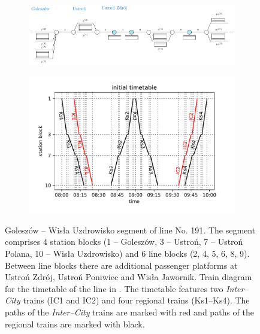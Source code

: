 \begin{figure}
  \begin{subfigure}{\textwidth}
    \caption{}\label{fig:linelarge:line}
    \includegraphics[width=\textwidth]{figures/line.pdf}
  \end{subfigure}
  \begin{subfigure}{\textwidth}
    \caption{}\label{fig:linelarge:diagram}
    \includegraphics[width=\textwidth]{figures/train_diagram}
  \end{subfigure}
  \caption{ Goleszów -- Wisła Uzdrowisko segment of line No. 191. The segment comprises 4
      station blocks (1 -- Goleszów, 3 -- Ustroń, 7 -- Ustroń Polana, 10 -- Wisła
      Uzdrowisko) and 6 line blocks (2, 4, 5, 6, 8, 9). Between line blocks there are
      additional passenger platforms at Ustroń Zdrój, Ustroń Poniwiec and Wisła
      Jawornik.  Train diagram for the timetable of the line in .
      The timetable features two \emph{Inter--City} trains (IC1 and IC2) and four regional trains (Ks1--Ks4).
      The paths of the \emph{Inter--City} trains are marked with red and paths of the regional trains are
      marked with black.}
    \label{fig:linelarge}
\end{figure}

